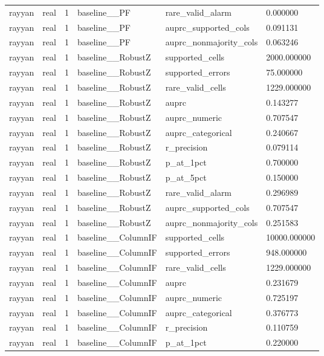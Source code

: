 \begin{tabular}{llllll}
rayyan & real & 1 & baseline\_\_PF & rare\_valid\_alarm & 0.000000 \\
rayyan & real & 1 & baseline\_\_PF & auprc\_supported\_cols & 0.091131 \\
rayyan & real & 1 & baseline\_\_PF & auprc\_nonmajority\_cols & 0.063246 \\
rayyan & real & 1 & baseline\_\_RobustZ & supported\_cells & 2000.000000 \\
rayyan & real & 1 & baseline\_\_RobustZ & supported\_errors & 75.000000 \\
rayyan & real & 1 & baseline\_\_RobustZ & rare\_valid\_cells & 1229.000000 \\
rayyan & real & 1 & baseline\_\_RobustZ & auprc & 0.143277 \\
rayyan & real & 1 & baseline\_\_RobustZ & auprc\_numeric & 0.707547 \\
rayyan & real & 1 & baseline\_\_RobustZ & auprc\_categorical & 0.240667 \\
rayyan & real & 1 & baseline\_\_RobustZ & r\_precision & 0.079114 \\
rayyan & real & 1 & baseline\_\_RobustZ & p\_at\_1pct & 0.700000 \\
rayyan & real & 1 & baseline\_\_RobustZ & p\_at\_5pct & 0.150000 \\
rayyan & real & 1 & baseline\_\_RobustZ & rare\_valid\_alarm & 0.296989 \\
rayyan & real & 1 & baseline\_\_RobustZ & auprc\_supported\_cols & 0.707547 \\
rayyan & real & 1 & baseline\_\_RobustZ & auprc\_nonmajority\_cols & 0.251583 \\
rayyan & real & 1 & baseline\_\_ColumnIF & supported\_cells & 10000.000000 \\
rayyan & real & 1 & baseline\_\_ColumnIF & supported\_errors & 948.000000 \\
rayyan & real & 1 & baseline\_\_ColumnIF & rare\_valid\_cells & 1229.000000 \\
rayyan & real & 1 & baseline\_\_ColumnIF & auprc & 0.231679 \\
rayyan & real & 1 & baseline\_\_ColumnIF & auprc\_numeric & 0.725197 \\
rayyan & real & 1 & baseline\_\_ColumnIF & auprc\_categorical & 0.376773 \\
rayyan & real & 1 & baseline\_\_ColumnIF & r\_precision & 0.110759 \\
rayyan & real & 1 & baseline\_\_ColumnIF & p\_at\_1pct & 0.220000 \\

\end{tabular}
